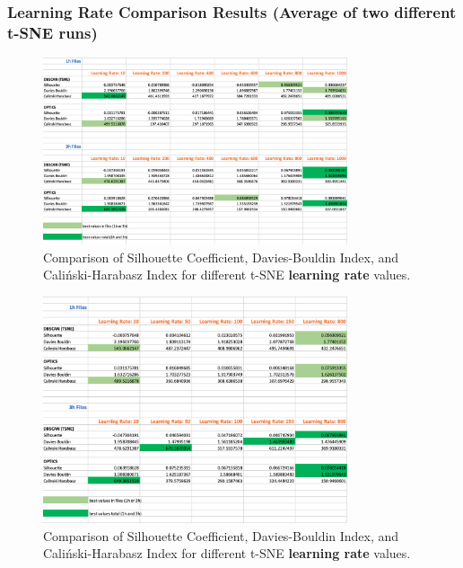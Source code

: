 \subsubsection{Learning Rate Comparison Results (Average of two different t-SNE runs)}
\label{appendix:compareAverageLearningRate}


\begin{figure}
  \centering
  \includegraphics[width=0.8\textwidth]{./images/tsneParametersTest/learningRate/learningRateEvaluationScoresAverage.png}
  \caption{Comparison of Silhouette Coefficient, Davies-Bouldin Index, and Caliński-Harabasz Index for different t-SNE \textbf{learning rate} values.}
  \label{figure:learningRateEvaluationScoresAverage}
\end{figure}

\begin{figure}
  \centering
  \includegraphics[width=0.8\textwidth]{./images/tsneParametersTest/learningRate/learningRateEvaluationScoresAverageDetailed.png}
  \caption{Comparison of Silhouette Coefficient, Davies-Bouldin Index, and Caliński-Harabasz Index for different t-SNE \textbf{learning rate} values.}
  \label{figure:learningRateEvaluationScoresAverageDetailed}
\end{figure}

